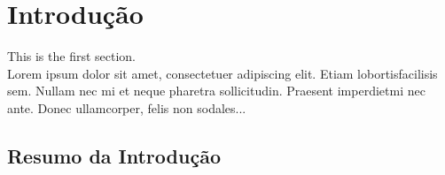 \newpage

\section{Introdução}
This is the first section.\\
Lorem  ipsum  dolor  sit  amet,  consectetuer  adipiscing  
elit.   Etiam  lobortisfacilisis sem.  Nullam nec mi et 
neque pharetra sollicitudin.  Praesent imperdietmi nec ante. 
Donec ullamcorper, felis non sodales...

\subsection{Resumo da Introdução}